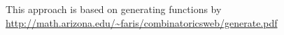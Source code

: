 ﻿\documentclass{article}
\begin{document}
    This approach is based on generating functions
    by \url{http://math.arizona.edu/~faris/combinatoricsweb/generate.pdf}
\end{document}
